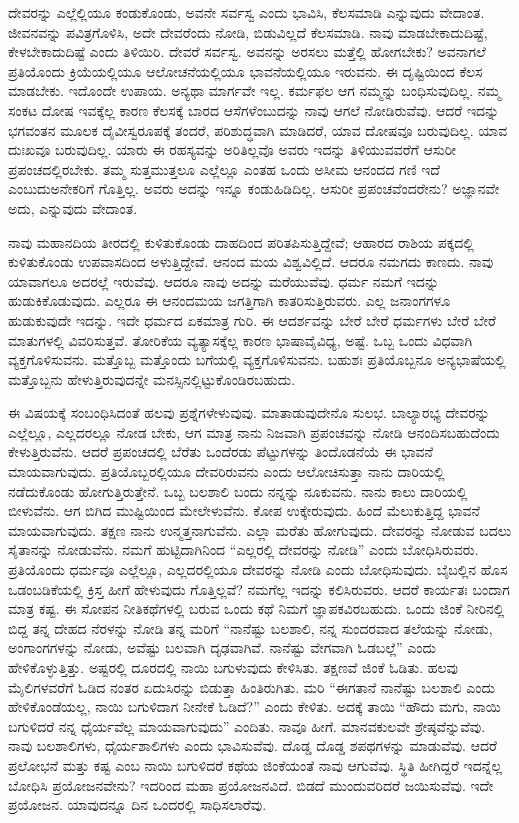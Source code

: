 ದೇವರನ್ನು ಎಲ್ಲೆಲ್ಲಿಯೂ ಕಂಡುಕೊಂಡು, ಅವನೇ ಸರ್ವಸ್ವ ಎಂದು ಭಾವಿಸಿ, ಕೆಲಸಮಾಡಿ ಎನ್ನುವುದು ವೇದಾಂತ. ಜೀವನವನ್ನು ಪವಿತ್ರಗೊಳಿಸಿ, ಅದೇ ದೇವರೆಂದು ನೋಡಿ, ಬಿಡುವಿಲ್ಲದೆ ಕೆಲಸಮಾಡಿ. ನಾವು ಮಾಡಬೇಕಾದುದಿಷ್ಟೆ, ಕೇಳಬೇಕಾದುದಿಷ್ಟೆ ಎಂದು ತಿಳಿಯಿರಿ. ದೇವರೆ ಸರ್ವಸ್ವ. ಅವನನ್ನು ಅರಸಲು ಮತ್ತೆಲ್ಲಿ ಹೋಗಬೇಕು? ಅವನಾಗಲೆ ಪ್ರತಿಯೊಂದು ಕ್ರಿಯೆಯಲ್ಲಿಯೂ ಆಲೋಚನೆಯಲ್ಲಿಯೂ ಭಾವನೆಯಲ್ಲಿಯೂ ಇರುವನು. ಈ ದೃಷ್ಟಿಯಿಂದ ಕೆಲಸ ಮಾಡಬೇಕು. ಇದೊಂದೇ ಉಪಾಯ. ಅನ್ಯಥಾ ಮಾರ್ಗವೇ ಇಲ್ಲ. ಕರ್ಮಫಲ ಆಗ ನಮ್ಮನ್ನು ಬಂಧಿಸುವುದಿಲ್ಲ. ನಮ್ಮ ಸಂಕಟ ದೋಷ ಇವಕ್ಕೆಲ್ಲ ಕಾರಣ ಕೆಲಸಕ್ಕೆ ಬಾರದ ಆಸೆಗಳೆಂಬುದನ್ನು ನಾವು ಆಗಲೆ ನೋಡಿರುವೆವು. ಆದರೆ ಇದನ್ನು ಭಗವಂತನ ಮೂಲಕ ದೈವೀಸ್ವರೂಪಕ್ಕೆ ತಂದರೆ, ಪರಿಶುದ್ಧವಾಗಿ ಮಾಡಿದರೆ, ಯಾವ ದೋಷವೂ ಬರುವುದಿಲ್ಲ. ಯಾವ ದುಃಖವೂ ಬರುವುದಿಲ್ಲ. ಯಾರು ಈ ರಹಸ್ಯವನ್ನು ಅರಿತಿಲ್ಲವೊ ಅವರು ಇದನ್ನು ತಿಳಿಯುವವರೆಗೆ ಆಸುರೀ ಪ್ರಪಂಚದಲ್ಲಿರಬೇಕು. ತಮ್ಮ ಸುತ್ತಮುತ್ತಲೂ ಎಲ್ಲೆಲ್ಲೂ ಎಂತಹ ಒಂದು ಅಸೀಮ ಆನಂದದ ಗಣಿ ಇದೆ ಎಂಬುದು\break ಅನೇಕರಿಗೆ ಗೊತ್ತಿಲ್ಲ. ಅವರು ಅದನ್ನು ಇನ್ನೂ ಕಂಡುಹಿಡಿದಿಲ್ಲ. ಆಸುರೀ ಪ್ರಪಂಚವೆಂದರೇನು? ಅಜ್ಞಾನವೇ ಅದು, ಎನ್ನುವುದು ವೇದಾಂತ.

ನಾವು ಮಹಾನದಿಯ ತೀರದಲ್ಲಿ ಕುಳಿತುಕೊಂಡು ದಾಹದಿಂದ ಪರಿತಪಿಸುತ್ತಿದ್ದೇವೆ; ಆಹಾರದ ರಾಶಿಯ ಪಕ್ಕದಲ್ಲಿ ಕುಳಿತುಕೊಂಡು ಉಪವಾಸದಿಂದ ಅಳುತ್ತಿದ್ದೇವೆ. ಆನಂದ\- ಮಯ ವಿಶ್ವವಿಲ್ಲಿದೆ. ಆದರೂ ನಮಗದು ಕಾಣದು. ನಾವು ಯಾವಾಗಲೂ ಅದರಲ್ಲೆ ಇರುವೆವು. ಆದರೂ ನಾವು ಅದನ್ನು ಮರೆಯುವೆವು. ಧರ್ಮ ನಮಗೆ ಇದನ್ನು ಹುಡುಕಿಕೊಡುವುದು. ಎಲ್ಲರೂ ಈ ಆನಂದಮಯ ಜಗತ್ತಿಗಾಗಿ ಕಾತರಿಸುತ್ತಿರುವರು. ಎಲ್ಲ ಜನಾಂಗಗಳೂ ಹುಡುಕುವುದೇ ಇದನ್ನು. ಇದೇ ಧರ್ಮದ ಏಕಮಾತ್ರ ಗುರಿ. ಈ ಆದರ್ಶವನ್ನು ಬೇರೆ ಬೇರೆ ಧರ್ಮಗಳು ಬೇರೆ ಬೇರೆ ಮಾತುಗಳಲ್ಲಿ ವಿವರಿಸುತ್ತವೆ. ತೋರಿಕೆಯ ವ್ಯತ್ಯಾಸಕ್ಕೆಲ್ಲ ಕಾರಣ ಭಾಷಾವೈವಿಧ್ಯ, ಅಷ್ಟೆ. ಒಬ್ಬ ಒಂದು ವಿಧವಾಗಿ ವ್ಯಕ್ತಗೊಳಿಸುವನು. ಮತ್ತೊಬ್ಬ ಮತ್ತೊಂದು ಬಗೆಯಲ್ಲಿ ವ್ಯಕ್ತಗೊಳಿಸುವನು. ಬಹುಶಃ ಪ್ರತಿಯೊಬ್ಬನೂ ಅನ್ಯಭಾಷೆಯಲ್ಲಿ ಮತ್ತೊಬ್ಬನು ಹೇಳುತ್ತಿರುವುದನ್ನೇ ಮನಸ್ಸಿನಲ್ಲಿಟ್ಟುಕೊಂಡಿರಬಹುದು.

ಈ ವಿಷಯಕ್ಕೆ ಸಂಬಂಧಿಸಿದಂತೆ ಹಲವು ಪ್ರಶ್ನೆಗಳೇಳುವುವು. ಮಾತಾಡುವುದೇನೊ ಸುಲಭ. ಬಾಲ್ಯಾರಭ್ಯ ದೇವರನ್ನು ಎಲ್ಲೆಲ್ಲೂ, ಎಲ್ಲದರಲ್ಲೂ ನೋಡ ಬೇಕು, ಆಗ ಮಾತ್ರ ನಾನು ನಿಜವಾಗಿ ಪ್ರಪಂಚವನ್ನು ನೋಡಿ ಆನಂದಿಸಬಹುದೆಂದು ಕೇಳುತ್ತಿರುವೆನು. ಆದರೆ ಪ್ರಪಂಚದಲ್ಲಿ ಬೆರೆತು ಒಂದೆರಡು ಪೆಟ್ಟುಗಳನ್ನು ತಿಂದೊಡನೆಯೆ ಈ ಭಾವನೆ ಮಾಯವಾಗುವುದು. ಪ್ರತಿಯೊಬ್ಬರಲ್ಲಿಯೂ ದೇವರಿರುವನು ಎಂದು ಆಲೋಚಿಸುತ್ತಾ ನಾನು ದಾರಿಯಲ್ಲಿ ನಡೆದುಕೊಂಡು ಹೋಗುತ್ತಿರುತ್ತೇನೆ. ಒಬ್ಬ ಬಲಶಾಲಿ ಬಂದು ನನ್ನನ್ನು ನೂಕುವನು. ನಾನು ಕಾಲು ದಾರಿಯಲ್ಲಿ ಬೀಳುವೆನು. ಆಗ ಬಿಗಿದ ಮುಷ್ಟಿಯಿಂದ ಮೇಲೇಳುವೆನು. ಕೋಪ ಉಕ್ಕೇರುವುದು. ಹಿಂದೆ ಮೆಲುಕುತ್ತಿದ್ದ ಭಾವನೆ ಮಾಯವಾಗುವುದು. ತಕ್ಷಣ ನಾನು ಉನ್ಮತ್ತನಾಗುವೆನು. ಎಲ್ಲಾ ಮರೆತು ಹೋಗುವುದು. ದೇವರನ್ನು ನೋಡುವ ಬದಲು ಸೈತಾನನ್ನು ನೋಡುವೆನು. ನಮಗೆ ಹುಟ್ಟಿದಾಗಿನಿಂದ “ಎಲ್ಲರಲ್ಲಿ ದೇವರನ್ನು ನೋಡಿ” ಎಂದು ಬೋಧಿಸಿರುವರು. ಪ್ರತಿಯೊಂದು ಧರ್ಮವೂ ಎಲ್ಲೆಲ್ಲೂ, ಎಲ್ಲದರಲ್ಲಿಯೂ ದೇವರನ್ನು ನೋಡಿ ಎಂದು ಬೋಧಿಸುವುದು. ಬೈಬಲ್ಲಿನ ಹೊಸ ಒಡಂಬಡಿಕೆಯಲ್ಲಿ ಕ್ರಿಸ್ತ ಹೀಗೆ ಹೇಳುವುದು ಗೊತ್ತಿಲ್ಲವೆ? ನಮಗೆಲ್ಲ ಇದನ್ನು ಕಲಿಸಿರುವರು. ಆದರೆ ಕಾರ್ಯತಃ ಬಂದಾಗ ಮಾತ್ರ ಕಷ್ಟ. ಈ ಸೋಪನ ನೀತಿಕಥೆಗಳಲ್ಲಿ ಬರುವ ಒಂದು ಕಥೆ ನಿಮಗೆ ಜ್ಞಾಪಕವಿರಬಹುದು. ಒಂದು ಜಿಂಕೆ ನೀರಿನಲ್ಲಿ ಬಿದ್ದ ತನ್ನ ದೇಹದ ನೆರಳನ್ನು ನೋಡಿ ತನ್ನ ಮರಿಗೆ “ನಾನೆಷ್ಟು ಬಲಶಾಲಿ, ನನ್ನ ಸುಂದರವಾದ ತಲೆಯನ್ನು ನೋಡು, ಅಂಗಾಂಗಗಳನ್ನು ನೋಡು, ಅವೆಷ್ಟು ಬಲವಾಗಿ ದೃಢವಾಗಿವೆ. ನಾನೆಷ್ಟು ವೇಗವಾಗಿ ಓಡಬಲ್ಲೆ” ಎಂದು ಹೇಳಿಕೊಳ್ಳುತ್ತಿತ್ತು. ಅಷ್ಟರಲ್ಲಿ ದೂರದಲ್ಲಿ ನಾಯಿ ಬಗುಳುವುದು ಕೇಳಿಸಿತು. ತಕ್ಷಣವೆ ಜಿಂಕೆ ಓಡಿತು. ಹಲವು ಮೈಲಿಗಳವರೆಗೆ ಓಡಿದ ನಂತರ ಏದುಸಿರನ್ನು ಬಿಡುತ್ತಾ ಹಿಂತಿರುಗಿತು. ಮರಿ “ಈಗತಾನೆ ನಾನೆಷ್ಟು ಬಲಶಾಲಿ ಎಂದು ಹೇಳಿಕೊಂಡೆಯಲ್ಲ, ನಾಯಿ ಬಗುಳಿದಾಗ ನೀನೇಕೆ ಓಡಿದೆ?” ಎಂದು ಕೇಳಿತು. ಅದಕ್ಕೆ ತಾಯಿ “ಹೌದು ಮಗು, ನಾಯಿ ಬಗುಳಿದರೆ ನನ್ನ ಧೈರ್ಯವೆಲ್ಲ ಮಾಯವಾಗುವುದು” ಎಂದಿತು. ನಾವೂ ಹೀಗೆ. ಮಾನವಕುಲವೇ ಶ್ರೇಷ್ಠವೆನ್ನುವೆವು. ನಾವು ಬಲಶಾಲಿಗಳು, ಧೈರ್ಯಶಾಲಿಗಳು ಎಂದು ಭಾವಿಸುವೆವು. ದೊಡ್ಡ ದೊಡ್ಡ ಶಪಥಗಳನ್ನು ಮಾಡುವೆವು. ಆದರೆ ಪ್ರಲೋಭನೆ ಮತ್ತು ಕಷ್ಟ ಎಂಬ ನಾಯಿ ಬಗುಳಿದರೆ ಕಥೆಯ ಜಿಂಕೆಯಂತೆ ನಾವು ಆಗುವೆವು. ಸ್ಥಿತಿ ಹೀಗಿದ್ದರೆ ಇದನ್ನೆಲ್ಲ ಬೋಧಿಸಿ ಪ್ರಯೋಜನವೇನು? ಇದರಿಂದ ಮಹಾ ಪ್ರಯೋಜನವಿದೆ. ಬಿಡದೆ ಮುಂದುವರಿದರೆ ಜಯಿಸುವೆವು. ಇದೇ ಪ್ರಯೋಜನ. ಯಾವುದನ್ನೂ ದಿನ ಒಂದರಲ್ಲಿ ಸಾಧಿಸಲಾರೆವು.


